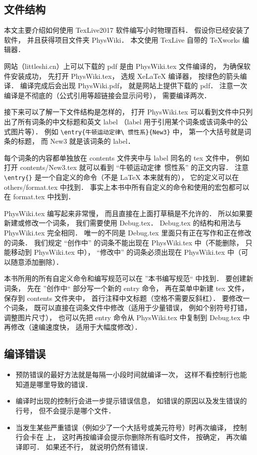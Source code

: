 
\subsection{文件结构}

本文主要介绍如何使用 TexLive2017 软件编写小时物理百科． 假设你已经安装了软件， 并且获得项目文件夹 PhysWiki． 本文使用 TexLive 自带的 TeXworks 编辑器．

网站（littleshi.cn）上可以下载的 pdf 是由 PhysWiki.tex 文件编译的， 为确保软件安装成功， 先打开 PhysWiki.tex， 选规 XeLaTeX 编译器， 按绿色的箭头编译． 编译完成后会出现 PhysWiki.pdf， 就是网站上提供下载的 pdf． 注意一次编译是不彻底的（公式引用等超链接会显示问号）， 需要编译两次．

接下来可以了解一下文件结构是怎样的， 打开 PhysWiki.tex 可以看到文件中只列出了所有词条的中文标题和英文 label （label 用于引用某个词条或该词条中的公式图片等）． 例如 \lstinline|\entry{牛顿运动定律\ 惯性系}{New3}| 中， 第一个大括号就是词条的标题， 而 New3 就是该词条的 label．

每个词条的内容都单独放在 contents 文件夹中与 label 同名的 tex 文件中， 例如打开 contents/New3.tex 就可以看到 “牛顿运动定律\ 惯性系” 的正文内容． 注意 \lstinline|\entry{}| 是一个自定义的命令（不是 LaTeX 本来就有的）， 它的定义可以在 others/format.tex 中找到． 事实上本书中所有自定义的命令和使用的宏包都可以在 format.tex 中找到．

PhysWiki.tex 编写起来非常慢， 而且直接在上面打草稿是不允许的． 所以如果要新建或修改一个词条， 我们需要使用 Debug.tex． Debug.tex 的结构和用法与 PhysWiki.tex 完全相同． 唯一的不同是 Debug.tex 里面只有正在写作和正在修改的词条． 我们规定 “创作中” 的词条不能出现在 PhysWiki.tex 中（不能删除， 只能移动到 PhysWiki.tex 中）， “修改中” 的词条必须出现在 PhysWiki.tex 中（可以随意添加删除）．

本书所用的所有自定义命令和编写规范可以在 ”本书编写规范“ 中找到． 要创建新词条， 先在 ”创作中“ 部分写一个新的 entry 命令， 再在菜单中新建 tex 文件， 保存到 contents 文件夹中， 首行注释中文标题（空格不需要反斜杠）． 要修改一个词条， 既可以直接在词条文件中修改（适用于少量错误， 例如个别符号打错， 调整图片尺寸）， 也可以先把 entry 命令从 PhysWiki.tex 中复制到 Debug.tex 中再修改（速编速度快， 适用于大幅度修改）．

\subsection{编译错误}

\begin{itemize}
\item 预防错误的最好方法就是每隔一小段时间就编译一次， 这样不看控制行也能知道是哪里导致的错误．
\item 编译时出现的控制行会进一步提示错误信息， 如错误的原因以及发生错误的行号， 但不会提示是哪个文件．
\item 当发生某些严重错误（例如少了一个大括号或美元符号）时再次编译， 控制行会卡在 \lstinline|| 上， 这时再按编译会提示你删除所有临时文件， 按确定， 再次编译即可． 如果还不行， 就说明仍然有错误．
\end{itemize}
